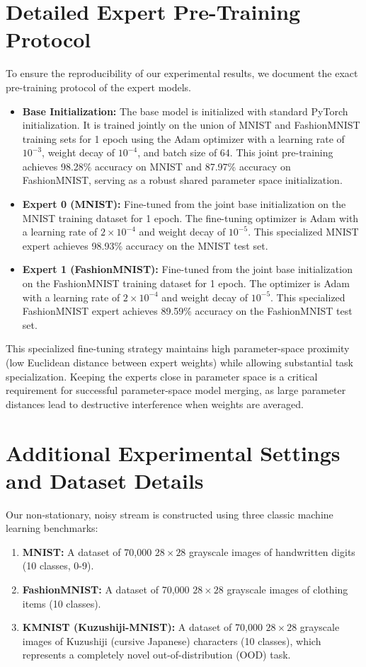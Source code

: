 \documentclass{article}
\theoremstyle{plain}
\theoremstyle{definition}
\theoremstyle{remark}
\begin{document}
\section{Detailed Expert Pre-Training Protocol}
\label{app:expert}
To ensure the reproducibility of our experimental results, we document the exact pre-training protocol of the expert models.
\begin{itemize}
    \item \textbf{Base Initialization:} The base model is initialized with standard PyTorch initialization. It is trained jointly on the union of MNIST and FashionMNIST training sets for 1 epoch using the Adam optimizer with a learning rate of $10^{-3}$, weight decay of $10^{-4}$, and batch size of 64. This joint pre-training achieves 98.28\% accuracy on MNIST and 87.97\% accuracy on FashionMNIST, serving as a robust shared parameter space initialization.
    \item \textbf{Expert 0 (MNIST):} Fine-tuned from the joint base initialization on the MNIST training dataset for 1 epoch. The fine-tuning optimizer is Adam with a learning rate of $2 \times 10^{-4}$ and weight decay of $10^{-5}$. This specialized MNIST expert achieves 98.93\% accuracy on the MNIST test set.
    \item \textbf{Expert 1 (FashionMNIST):} Fine-tuned from the joint base initialization on the FashionMNIST training dataset for 1 epoch. The optimizer is Adam with a learning rate of $2 \times 10^{-4}$ and weight decay of $10^{-5}$. This specialized FashionMNIST expert achieves 89.59\% accuracy on the FashionMNIST test set.
\end{itemize}
This specialized fine-tuning strategy maintains high parameter-space proximity (low Euclidean distance between expert weights) while allowing substantial task specialization. Keeping the experts close in parameter space is a critical requirement for successful parameter-space model merging, as large parameter distances lead to destructive interference when weights are averaged.

\section{Additional Experimental Settings and Dataset Details}
\label{app:datasets}
Our non-stationary, noisy stream is constructed using three classic machine learning benchmarks:
\begin{enumerate}
    \item \textbf{MNIST:} A dataset of 70,000 $28\times28$ grayscale images of handwritten digits (10 classes, 0-9).
    \item \textbf{FashionMNIST:} A dataset of 70,000 $28\times28$ grayscale images of clothing items (10 classes).
    \item \textbf{KMNIST (Kuzushiji-MNIST):} A dataset of 70,000 $28\times28$ grayscale images of Kuzushiji (cursive Japanese) characters (10 classes), which represents a completely novel out-of-distribution (OOD) task.
\end{enumerate}
\end{document}
